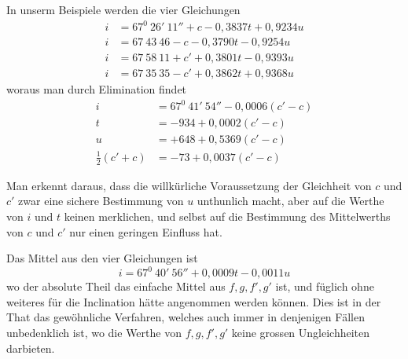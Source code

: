 \par{}
\par\clearpage
{}
In unserm Beispiele werden die vier Gleichungen
\[
\begin{aligned}
i&=67^0\ 26'\ 11''+c-0{,}3837t+0{,}9234u\\
i&=67\ 43\ 46-c-0{,}3790t-0{,}9254u\\
i&=67\ 58\ 11+c'+0{,}3801t-0{,}9393u\\
i&=67\ 35\ 35-c'+0{,}3862t+0{,}9368u
\end{aligned}
\]
woraus man durch Elimination findet
\[
\begin{aligned}
i&=67^0\ 41'\ 54''-0{,}0006(c'-c)\\
t&=-934+0{,}0002(c'-c)\\
u&=+648+0{,}5369(c'-c)\\
\tfrac12(c'+c)&=-73+0{,}0037(c'-c)
\end{aligned}
\]

Man erkennt daraus, dass die willkürliche Voraussetzung der Gleichheit von $c$ und $c'$ zwar eine sichere Bestimmung von $u$ unthunlich macht, aber auf die Werthe von $i$ und $t$ keinen merklichen, und selbst auf die Bestimmung des Mittelwerths von $c$ und $c'$ nur einen geringen Einfluss hat.

Das Mittel aus den vier Gleichungen ist
\[
i=67^0\ 40'\ 56''+0{,}0009t-0{,}0011u
\]
wo der absolute Theil das einfache Mittel aus $f,g,f',g'$ ist, und füglich ohne weiteres für die Inclination hätte angenommen werden können. Dies ist in der That das gewöhnliche Verfahren, welches auch immer in denjenigen Fällen unbedenklich ist, wo die Werthe von $f,g,f',g'$ keine grossen Ungleichheiten darbieten.


